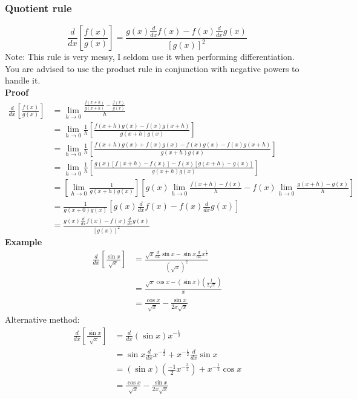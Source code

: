 \documentclass{article}
\begin{document}
\subsubsection{Quotient rule}
\begin{equation*}
    \frac{d}{dx}\left[\frac{f( x)}{g( x)}\right] =\frac{g( x)\frac{d}{dx} f( x) -f( x)\frac{d}{dx} g( x)}{[ g( x)]^{2}}
\end{equation*}
Note: This rule is very messy, I seldom
use it when performing differentiation.
You are advised to use the product rule
in conjunction with negative powers to
handle it.\\
\textbf{Proof}
\begin{equation*}
\begin{aligned}
    \frac{d}{dx}\left[\frac{f( x)}{g( x)}\right] & =\lim _{h\rightarrow 0}\frac{\frac{f( x+h)}{g( x+h)} -\frac{f( x)}{g( x)}}{h}\\
    & =\lim _{h\rightarrow 0}\frac{1}{h}\left[\frac{f( x+h) g( x) -f( x) g( x+h)}{g( x+h) g( x)}\right]\\
    & =\lim _{h\rightarrow 0}\frac{1}{h}\left[\frac{f( x+h) g( x) +f( x) g( x) -f( x) g( x) -f( x) g( x+h)}{g( x+h) g( x)}\right]\\
    & =\lim _{h\rightarrow 0}\frac{1}{h}\left[\frac{g( x)[ f( x+h) -f( x)] -f( x)[ g( x+h) -g( x)]}{g( x+h) g( x)}\right]\\
    & =\left[\lim _{h\rightarrow 0}\frac{1}{g( x+h) g( x)}\right]\left[ g( x)\lim _{h\rightarrow 0}\frac{f( x+h) -f( x)}{h} -f( x)\lim _{h\rightarrow 0}\frac{g( x+h) -g( x)}{h}\right]\\
    & =\frac{1}{g( x+0) g( x)}\left[ g( x)\frac{d}{dx} f( x) -f( x)\frac{d}{dx} g( x)\right]\\
    & =\frac{g( x)\frac{d}{dx} f( x) -f( x)\frac{d}{dx} g( x)}{[ g( x)]^{2}}
\end{aligned}
\end{equation*}
\textbf{Example}
\begin{equation*}
\begin{aligned}
    \frac{d}{dx}\left[\frac{\sin x}{\sqrt{x}}\right] & =\frac{\sqrt{x}\frac{d}{dx}\sin x-\sin x\frac{d}{dx} x^{\frac{1}{2}}}{\left(\sqrt{x}\right)^{2}}\\
    & =\frac{\sqrt{x}\cos x-(\sin x)\left(\frac{1}{2\sqrt{x}}\right)}{x}\\
    & =\frac{\cos x}{\sqrt{x}} -\frac{\sin x}{2x\sqrt{x}}
\end{aligned}
\end{equation*}
Alternative method:
\begin{equation*}
\begin{aligned}
    \frac{d}{dx}\left[\frac{\sin x}{\sqrt{x}}\right] & =\frac{d}{dx}(\sin x) x^{-\frac{1}{2}}\\
    & =\sin x\frac{d}{dx} x^{-\frac{1}{2}} +x^{-\frac{1}{2}}\frac{d}{dx}\sin x\\
    & =(\sin x)\left(\frac{-1}{2} x^{-\frac{3}{2}}\right) +x^{-\frac{1}{2}}\cos x\\
    & =\frac{\cos x}{\sqrt{x}} -\frac{\sin x}{2x\sqrt{x}}
\end{aligned}
\end{equation*}
\end{document}
